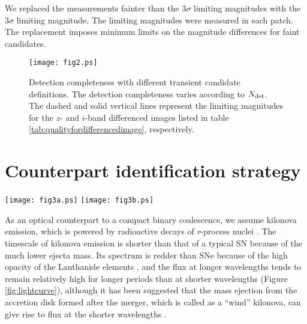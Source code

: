 \documentclass[]{pasj01}
\begin{document}
We replaced the measurements fainter than the $3\sigma$ limiting magnitudes with the $3\sigma$ limiting magnitude. The limiting magnitudes were measured in each patch. The replacement imposes minimum limits on the magnitude differences for faint candidates.

\begin{figure}
 \begin{center}
  \texttt{[image: fig2.ps]} 
 \end{center}
\caption{Detection completeness with different transient candidate definitions. The detection completeness varies according to $N_{\rm det}$. The dashed and solid vertical lines represent the limiting magnitudes for the $z$- and $i$-band differenced images listed in table \ref{tab:qualityfordifferencedimage}, respectively. }\label{fig:completeness}
\end{figure}

\section{Counterpart identification strategy}\label{strategy}

\begin{figure*}
 \begin{center}
   \texttt{[image: fig3a.ps]}
   \texttt{[image: fig3b.ps]}
 \end{center}
\caption{Light curves of kilonova models at 200 Mpc and SNe Ia at different redshifts.
The models for the NS-NS \citep{2013ApJ...775..113T}, BH-NS \citep{2014ApJ...780...31T} and wind \citep{2016AdAst2016E...8T} kilonovae rapidly decrease in  apparent magnitude compared to all the SN Ia models.  For the SN models, t=0 corresponds to the time of maximum light in the B-band. 
}\label{fig:lightcurve}
\end{figure*}

As an optical counterpart to a compact binary coalescence,
we assume kilonova emission, which is powered by
radioactive decays of {\it r}-process nuclei
\citep{1998ApJ...507L..59L,2005astro.ph.10256K,2010MNRAS.406.2650M}.
The timescale of kilonova emission is shorter than that of a typical SN
because of the much lower ejecta mass.
Its spectrum is redder than SNe because of the high opacity of the Lanthanide elements
\citep{2013ApJ...775...18B,2013ApJ...774...25K,2013ApJ...775..113T},
and the flux at longer wavelengths tends to remain relatively high for longer periods than at shorter wavelengths (Figure \ref{fig:lightcurve}),
although
it has been suggested that the mass ejection from the accretion disk formed after the merger,
which is called as a ``wind'' kilonova, can give rise to flux at the shorter wavelengths \citep{2014MNRAS.441.3444M,2015MNRAS.450.1777K}.
\end{document}

